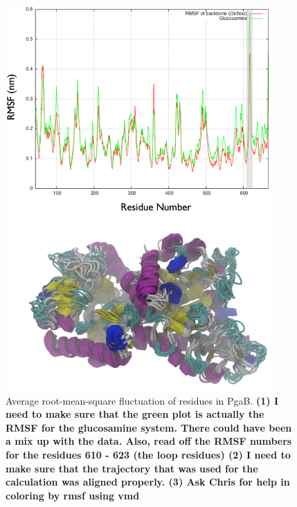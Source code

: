 {\begin{figure}[htbp]
\centering
\includegraphics[width=4in]{figures/results4/rmsf.pdf}
\caption[RMSF of residues in PgaB]{Average root-mean-square fluctuation of residues in PgaB. \textbf{(1) I need to make sure that the green plot is actually the RMSF for the glucosamine system. There could have been a mix up with the data. Also, read off the RMSF numbers for the residues 610 - 623 (the loop residues) (2) I need to make sure that the trajectory that was used for the calculation was aligned properly. (3) Ask Chris for help in coloring by rmsf using vmd}}
\label{fig:rmsf}
\end{figure}


}
